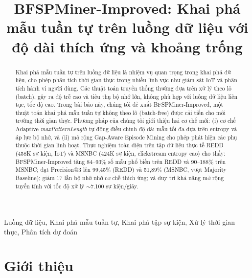 \documentclass[conference]{IEEEtran}
\begin{document}
\title{BFSPMiner-Improved: Khai phá mẫu tuần tự trên luồng dữ liệu với độ dài thích ứng và khoảng trống}

\author{
\and
{}
\and
{}
}

\maketitle

\begin{abstract}
Khai phá mẫu tuần tự trên luồng dữ liệu là nhiệm vụ quan trọng trong khai phá dữ liệu, cho phép phân tích thời gian thực trong nhiều lĩnh vực như giám sát IoT và phân tích hành vi người dùng. Các thuật toán truyền thống thường dựa trên xử lý theo lô (batch), gây ra độ trễ cao và tiêu thụ bộ nhớ lớn, không phù hợp với luồng dữ liệu liên tục, tốc độ cao. Trong bài báo này, chúng tôi đề xuất BFSPMiner-Improved, một thuật toán khai phá mẫu tuần tự không theo lô (batch-free) được cải tiến cho môi trường thời gian thực. Phương pháp của chúng tôi giới thiệu hai cơ chế mới: (i) cơ chế Adaptive \textit{maxPatternLength} tự động điều chỉnh độ dài mẫu tối đa dựa trên entropy và áp lực bộ nhớ, và (ii) mở rộng Gap-Aware Episode Mining cho phép phát hiện các phụ thuộc thời gian linh hoạt. Thực nghiệm toàn diện trên tập dữ liệu thực tế REDD (458K sự kiện, IoT) và MSNBC (424K sự kiện, clickstream entropy cao) cho thấy: BFSPMiner-Improved tăng 84--93\% số mẫu phổ biến trên REDD và 90--188\% trên MSNBC; đạt Precision@3 lên 99,45\% (REDD) và 51,89\% (MSNBC, vượt Majority Baseline); giảm 17 lần bộ nhớ nhờ cơ chế thích ứng; và duy trì khả năng mở rộng tuyến tính với tốc độ xử lý $\sim$7.100 sự kiện/giây.
\end{abstract}

\begin{IEEEkeywords}
Luồng dữ liệu, Khai phá mẫu tuần tự, Khai phá tập sự kiện, Xử lý thời gian thực, Phân tích dự đoán
\end{IEEEkeywords}

\section{Giới thiệu}
\label{sec:intro}
\end{document}
